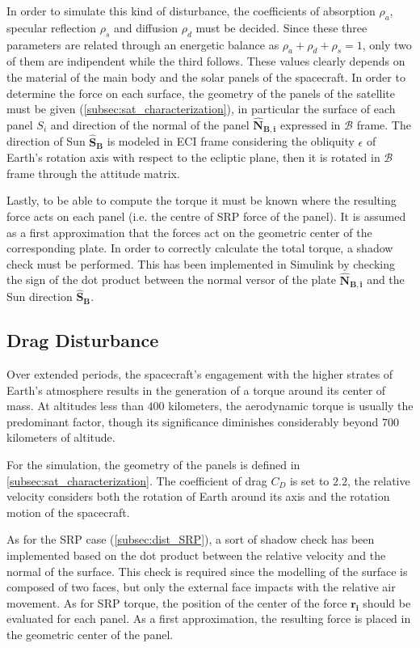 In order to simulate this kind of disturbance, the coefficients of absorption $\rho_a$, specular reflection $\rho_s$ and diffusion $\rho_d$ must be decided. Since these three parameters are related through an energetic balance as $\rho_a + \rho_d + \rho_s = 1$, only two of them are indipendent while the third follows. These values clearly depends on the material of the main body and the solar panels of the spacecraft.
In order to determine the force on each surface, the geometry of the panels of the satellite must be given (\autoref{subsec:sat_characterization}), in particular the surface of each panel $S_i$ and direction of the normal of the panel $\boldsymbol{\hat{N}_{B,i}}$ expressed in $\mathcal{B}$ frame.
The direction of Sun $\boldsymbol{\hat{S}_B}$ is modeled in ECI frame considering the obliquity $\epsilon$ of Earth's rotation axis with respect to the ecliptic plane, then it is rotated in $\mathcal{B}$ frame through the attitude matrix.

Lastly, to be able to compute the torque it must be known where the resulting force acts on each panel (i.e. the centre of SRP force of the panel). It is assumed as a first approximation that the forces act on the geometric center of the corresponding plate. In order to correctly calculate the total torque, a shadow check must be performed. This has been implemented in Simulink by checking the sign of the dot product between the normal versor of the plate $\boldsymbol{\hat{N}_{B,i}}$ and the Sun direction $\boldsymbol{\hat{S}_B}$.


\subsection{Drag Disturbance}
\label{subsec:dist_drag}

Over extended periods, the spacecraft's engagement with the higher strates of Earth's atmosphere results in the generation of a torque around its center of mass. At altitudes less than $400$ kilometers, the aerodynamic torque is usually the predominant factor, though its significance diminishes considerably beyond $700$ kilometers of altitude.

For the simulation, the geometry of the panels is defined in \autoref{subsec:sat_characterization}. The coefficient of drag $C_D$ is set to $2.2$, the relative velocity considers both the rotation of Earth around its axis and the rotation motion of the spacecraft.

As for the SRP case (\autoref{subsec:dist_SRP}), a sort of shadow check has been implemented based on the dot product between the relative velocity and the normal of the surface. This check is required since the modelling of the surface is composed of two faces, but only the external face impacts with the relative air movement.
As for SRP torque, the position of the center of the force $\boldsymbol{r_i}$ should be evaluated for each panel. As a first approximation, the resulting force is placed in the geometric center of the panel.

